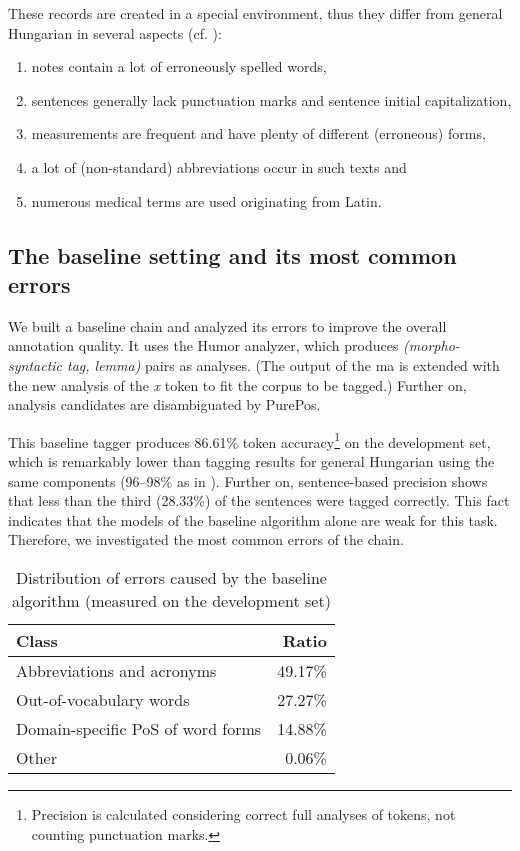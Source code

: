 These records are created in a special environment, thus they differ from general Hungarian in several aspects (cf. \cite{Orosz2013a,Siklosi2013b,Siklosi2012}):

\begin{enumerate} %
 \item notes contain a lot of erroneously spelled words,
 \item sentences generally lack punctuation marks and sentence initial capitalization, 
 \item measurements are frequent and have plenty of different (erroneous) forms,
 \item a lot of (non-standard) abbreviations occur in such texts and
 \item numerous medical terms are used originating from Latin.
\end{enumerate}

\subsection{The baseline setting and its most common errors}
\label{sec:baseline}

We built a baseline chain and analyzed its errors to improve the overall annotation quality.
It uses the Humor analyzer, which produces \emph{(morpho-syntactic tag, lemma)} pairs as analyses. 
(The output of the \acrshort{ma} is extended with the new analysis of the \textit{x} token to fit the corpus to be tagged.)
Further on, analysis candidates are disambiguated by PurePos. 

This baseline tagger produces 86.61\% token accuracy\footnote{Precision is calculated considering correct full analyses of tokens, not counting punctuation marks.} on the development set, which is remarkably lower than tagging results for general Hungarian using the same components (96--98\% as in \cite{Orosz2013b,zsibrata2013magyarlanc}). 
Further on, sentence-based precision shows that less than the third (28.33\%) of the sentences were tagged correctly. 
This fact indicates that the models of the baseline algorithm alone are weak for this task. 
Therefore, we investigated the most common errors of the chain.

\begin{table}[H]
\centering
\caption{Distribution of errors caused by the baseline algorithm (measured on the development set)}
\label{tab:error_types}
\begin{tabular}{ l r } 
\hline
Class & Ratio  \\
\hline
Abbreviations and acronyms & 49.17\% \\
Out-of-vocabulary words & 27.27\% \\
Domain-specific PoS of word forms & 14.88\% \\
Other & 0.06\% \\
\hline
\end{tabular}
\end{table}

